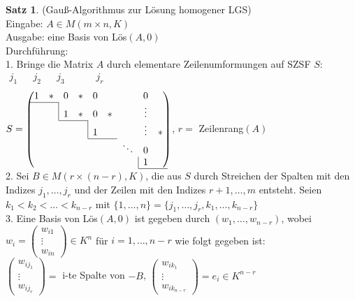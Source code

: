 \documentclass[10pt,a4paper,numbers=endperiod]{scrartcl}
\theoremstyle{definition}
\newtheorem{satz}{Satz}[section]
\begin{document}
\begin{satz}
	(Gauß-Algorithmus zur Lösung homogener LGS)\\
	Eingabe: $A \in M(m \times n, K)$\\
	Ausgabe: eine Basis von Lös$(A,0)$\\
	Durchführung:\\
	1. Bringe die Matrix $A$ durch elementare Zeilenumformungen auf SZSF $S$:\\
	\hspace*{8,5mm}$\begin{array}{ccccccccc}
	j_1&&j_2&&j_3&&&&j_r\\
	\end{array}$\\
	$ S= \begin{pmatrix}
	1&*&0&*&0&&&0&\\
	\cline{1-2}
	&&\multicolumn{1}{|c}{1}&*&0&*&&\vdots&\\
	\cline{3-4}
	&&&&\multicolumn{1}{|c}{1}&&&\vdots&*\\
	\cline{5-6} 
	&&&&&&\ddots&0&\\
	&&&&&&&\multicolumn{1}{|c}{1}&\\
	\cline{8-9}
	\end{pmatrix}$, $r=$ Zeilenrang$(A)$\\
	
	2. Sei $B \in M(r \times(n-r),K)$, die aus $S$ durch Streichen der Spalten mit den Indizes $j_1,\ldots, j_r$ und der Zeilen mit den Indizes $r+1,\ldots,m$ entsteht. Seien $k_1<k_2<\ldots<k_{n-r}$ mit $\{1,\ldots,n\}=\{j_1,\ldots,j_r,k_1,\ldots,k_{n-r}\}$\\
	
	3. Eine Basis von Lös$(A,0)$ ist gegeben durch $(w_1,\ldots,w_{n-r})$, wobei $w_i = \begin{pmatrix}
	w_{i1}\\\vdots\\
	w_{in}
	\end{pmatrix}\in K^n$ für $i=1,\ldots,n-r$ wie folgt gegeben ist:\\
	$\begin{pmatrix}
	w_{ij_1}\\\vdots\\
	w_{ij_r}
	\end{pmatrix} =$ i-te Spalte von $-B$, 
	$\begin{pmatrix}
		w_{ik_1}\\\vdots\\
		w_{ik_{n-r}}
	\end{pmatrix} = e_i \in K^{n-r}$
\end{satz}
\end{document}
